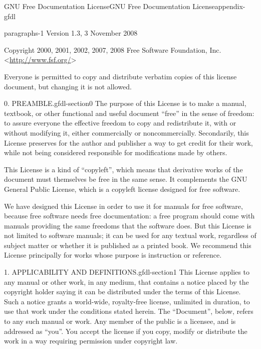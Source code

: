 \documentclass[oneside,10pt,]{book}
\numberwithin{equation}{section}
\begin{document}
\begin{appendixptx}{GNU Free Documentation License}{}{GNU Free Documentation License}{}{}{appendix-gfdl}
\begin{paragraphs}{}{paragraphs-1}%
\hypertarget{p-699}{}%
Version 1.3, 3 November 2008%
\par
\hypertarget{p-700}{}%
Copyright \textcopyright{} 2000, 2001, 2002, 2007, 2008 Free Software Foundation, Inc. \textless{}\url{http://www.fsf.org/}\textgreater{}%
\par
\hypertarget{p-701}{}%
Everyone is permitted to copy and distribute verbatim copies of this license document, but changing it is not allowed.%
\end{paragraphs}%
\begin{paragraphs}{0. PREAMBLE.}{gfdl-section0}%
\hypertarget{p-702}{}%
The purpose of this License is to make a manual, textbook, or other functional and useful document ``free'' in the sense of freedom: to assure everyone the effective freedom to copy and redistribute it, with or without modifying it, either commercially or noncommercially. Secondarily, this License preserves for the author and publisher a way to get credit for their work, while not being considered responsible for modifications made by others.%
\par
\hypertarget{p-703}{}%
This License is a kind of ``copyleft'', which means that derivative works of the document must themselves be free in the same sense. It complements the GNU General Public License, which is a copyleft license designed for free software.%
\par
\hypertarget{p-704}{}%
We have designed this License in order to use it for manuals for free software, because free software needs free documentation: a free program should come with manuals providing the same freedoms that the software does. But this License is not limited to software manuals; it can be used for any textual work, regardless of subject matter or whether it is published as a printed book. We recommend this License principally for works whose purpose is instruction or reference.%
\end{paragraphs}%
\begin{paragraphs}{1. APPLICABILITY AND DEFINITIONS.}{gfdl-section1}%
\hypertarget{p-705}{}%
This License applies to any manual or other work, in any medium, that contains a notice placed by the copyright holder saying it can be distributed under the terms of this License. Such a notice grants a world-wide, royalty-free license, unlimited in duration, to use that work under the conditions stated herein. The ``Document'', below, refers to any such manual or work. Any member of the public is a licensee, and is addressed as ``you''. You accept the license if you copy, modify or distribute the work in a way requiring permission under copyright law.%

\end{paragraphs}
\end{appendixptx}
\end{document}
